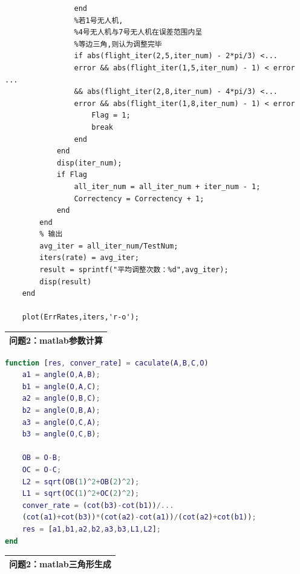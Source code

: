 \documentclass{my_paper}
\begin{document}
\begin{lstlisting}
                end
                %若1号无人机,
                %4号无人机与7号无人机在误差范围内呈
                %等边三角,则认为调整完毕
                if abs(flight_iter(2,5,iter_num) - 2*pi/3) <...
                error && abs(flight_iter(1,5,iter_num) - 1) < error ...
                && abs(flight_iter(2,8,iter_num) - 4*pi/3) <...
                error && abs(flight_iter(1,8,iter_num) - 1) < error
                    Flag = 1;
                    break
                end
            end
            disp(iter_num);
            if Flag
                all_iter_num = all_iter_num + iter_num - 1;
                Correctency = Correctency + 1;
            end
        end
        % 输出
        avg_iter = all_iter_num/TestNum;
        iters(rate) = avg_iter;
        result = sprintf("平均调整次数：%d",avg_iter);
        disp(result)
    end
    
    plot(ErrRates,iters,'r-o');
\end{lstlisting}

\begin{table}[htbp]
    \centering
    \begin{tabular}{|p{14.0cm}|}
    \hline
    \textbf{问题2：matlab参数计算} \\ %
    \hline
    \end{tabular}
\end{table}

\begin{lstlisting}[language=Matlab]
function [res, conver_rate] = caculate(A,B,C,O)
    a1 = angle(O,A,B);
    b1 = angle(O,A,C);
    a2 = angle(O,B,C);
    b2 = angle(O,B,A);
    a3 = angle(O,C,A);
    b3 = angle(O,C,B);

    OB = O-B;
    OC = O-C;
    L2 = sqrt(OB(1)^2+OB(2)^2);
    L1 = sqrt(OC(1)^2+OC(2)^2);
    conver_rate = (cot(b3)-cot(b1))/...
    (cot(a1)+cot(b3))*(cot(a2)-cot(a1))/(cot(a2)+cot(b1));
    res = [a1,b1,a2,b2,a3,b3,L1,L2]; 
end
\end{lstlisting}


\begin{table}[htbp]
    \centering
    \begin{tabular}{|p{14.0cm}|}
    \hline
    \textbf{问题2：matlab三角形生成} \\ %
    \hline
    \end{tabular}
\end{table}
\end{document}
